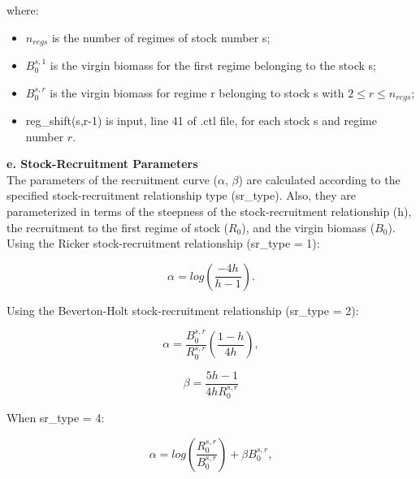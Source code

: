 \documentclass{article}
\begin{document}
where: 
\begin{itemize}
    \item $n_{regs}$ is the number of regimes of stock number s;
    \item %
    $B^{s,1}_0$ is the virgin biomass for the first regime belonging to the stock s;
    \item  %
    $B^{s,r}_0$ is the virgin biomass for regime r belonging to stock s with $2\leq r \leq n_{regs}$;
    \item reg\_shift(s,r-1) is input, line 41 of .ctl file, for each stock s and regime number $r$.
\end{itemize}

\hfill

\textbf{e. Stock-Recruitment Parameters}\\

The parameters of the recruitment curve ($\alpha$, $\beta$) are calculated according to the specified stock-recruitment relationship type (sr\_type). Also, they are parameterized in terms of the steepness of the stock-recruitment relationship (h), the recruitment to the first regime of stock ($R_0$), and the virgin biomass ($B_0$).\\

Using the Ricker stock-recruitment relationship (sr\_type = 1):

\begin{equation}
\alpha = log\left(\dfrac{-4h}{h-1}\right).
\end{equation}

Using the Beverton-Holt stock-recruitment relationship (sr\_type = 2):

\begin{equation}
\alpha = \dfrac{B^{s,r}_0}{R^{s,r}_0}\left(\dfrac{1 - h}{4h}\right),  
\end{equation}

\begin{equation}
\beta = \dfrac{5h-1}{4hR^{s,r}_0}
\end{equation}

When sr\_type = 4:

\begin{equation}
\alpha = log\left(\dfrac{R^{s,r}_0}{B^{s,r}_0}\right)+\beta B^{s,r}_0, 
\end{equation}
\end{document}

